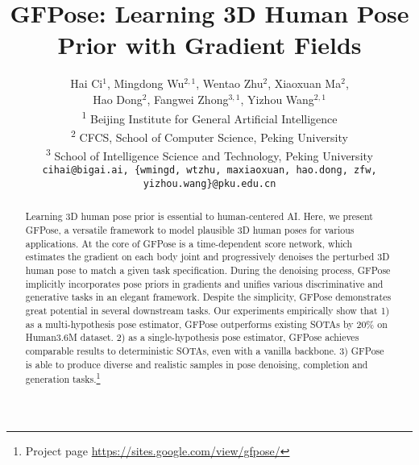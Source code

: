 \documentclass[10pt,twocolumn,letterpaper]{article}
\begin{document}
\title{GFPose: Learning 3D Human Pose Prior with Gradient Fields}

\author{Hai Ci$^1$, \quad Mingdong Wu$^{2,1}$, \quad 
Wentao Zhu$^{2}$, \quad Xiaoxuan Ma$^{2}$, \\
Hao Dong$^{2}$, \quad Fangwei Zhong$^{3,1}$, 
\quad Yizhou Wang$^{2,1}$\\
\textsuperscript{1} Beijing Institute for General Artificial Intelligence\\
\textsuperscript{2} CFCS, School of Computer Science, Peking University\\
\textsuperscript{3} School of Intelligence Science and Technology, Peking University\\
{\tt\small cihai@bigai.ai, \{wmingd, wtzhu, maxiaoxuan, hao.dong, zfw, yizhou.wang\}@pku.edu.cn}
}
\maketitle
\newcommand\mingdong[1]{\textcolor{teal}{WMD: #1}}

\newcommand{\loss}{\mathcal{L}}
\newcommand{\E}{\mathbb{E}}
\newcommand{\R}{\mathbb{R}}
\newcommand{\x}{x}
\newcommand{\z}{\mathbf{z}}
\newcommand{\N}{\mathcal{N}}
\newcommand{\X}{\mathcal{X}}
\newcommand{\C}{\mathcal{C}}
\newcommand{\data}{p_{data}}
\newcommand{\cond}{\mathbf{c}}
\newcommand{\pose}{\mathbf{x}}
\newcommand{\score}{\mathbf{s}_{\theta}}
\newcommand{\pscore}{\mathbf{\Phi}_{\theta}}
\newcommand\norm[1]{\left\lVert#1\right\rVert}

\newcommand{\npose}{\mathbf{\widetilde \x}}


\def\eg{\emph{e.g}.} \def\Eg{\emph{E.g}.}
\def\ie{\emph{i.e}.} \def\Ie{\emph{I.e}.}
\def\cf{\emph{c.f}.} \def\Cf{\emph{C.f}.}
\def\etc{\emph{etc}.} \def\vs{\emph{vs}.}
\def\wrt{w.r.t. } \def\dof{d.o.f. }
\def\etal{\emph{et al}. } 
\begin{abstract}
Learning 3D human pose prior is essential to human-centered AI.
Here, we present GFPose, a versatile framework to model plausible 3D human poses for various applications.
At the core of GFPose is a time-dependent score network, which estimates the gradient on each body joint and progressively denoises the perturbed 3D human pose to match a given task specification. 
During the denoising process, GFPose implicitly incorporates pose priors in gradients and unifies various discriminative and generative tasks in an elegant framework. 
    Despite the simplicity, GFPose demonstrates great potential in several downstream tasks. 
    Our experiments empirically show that 1) as a multi-hypothesis pose estimator, GFPose outperforms existing SOTAs by 20\% on Human3.6M dataset. 2) as a single-hypothesis pose estimator, GFPose achieves comparable results to deterministic SOTAs, even with a vanilla backbone. 3) GFPose is able to produce diverse and realistic samples in pose denoising, completion and generation tasks.\footnote{Project page \url{https://sites.google.com/view/gfpose/}}




\end{abstract} 
\vspace{-1.0em}
\end{document}
